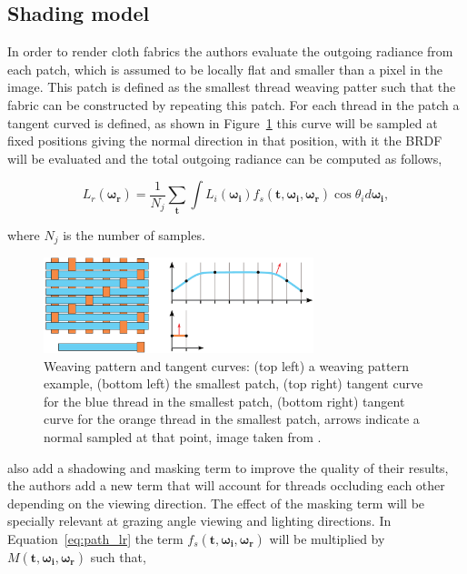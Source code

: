 \documentclass[12pt]{article}
\newcommand{\omegai}{\boldsymbol{\omega_i}}
\newcommand{\omegar}{\boldsymbol{\omega_r}}
\newcommand{\tb}{\mathbf{t}}
\begin{document}
\subsection{Shading model}
\label{sec:shading_model}

In order to render cloth fabrics the authors evaluate the outgoing radiance from each patch, which is assumed to be locally flat and smaller than a pixel in the image.
This patch is defined as the smallest thread weaving patter such that the fabric can be constructed by repeating this patch.
For each thread in the patch a tangent curved is defined, as shown in Figure~\ref{fig:tanget_curve} this curve will be sampled at fixed positions giving the normal direction in that position, with it the BRDF will be evaluated and the total outgoing radiance can be computed as follows,

\begin{equation}
L_{r}(\omegar) = \frac{1}{N_j} \sum_\tb \int L_i(\omegai) f_s(\tb, \omegai, \omegar) \cos \theta_i d \omegai,
\label{eq:path_lr}
\end{equation}

where $N_j$ is the number of samples.

\begin{figure}[htbp!]
\centering
\includegraphics[width=0.7\textwidth]{images/tanget_curve}
	\caption{Weaving pattern and tangent curves: (top left) a weaving pattern example, (bottom left) the smallest patch, (top right) tangent curve for the blue thread in the smallest patch, (bottom right) tangent curve for the orange thread in the smallest patch, arrows indicate a normal sampled at that point, image taken from \cite{Sadeghi2013}.}
	\label{fig:tanget_curve}
\end{figure}

\citeauthor{Sadeghi2013} also add a shadowing and masking term to improve the quality of their results, the authors add a new term that will account for threads occluding each other depending on the viewing direction.
The effect of the masking term will be specially relevant at grazing angle viewing and lighting directions.
In Equation~\ref{eq:path_lr} the term $f_s(\tb, \omegai, \omegar)$ will be multiplied by $M(\tb, \omegai, \omegar)$ such that,
\end{document}
